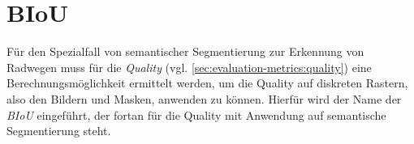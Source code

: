 
\section{\acf{BIoU}} \label{sec:eval:biou}

Für den Spezialfall von semantischer Segmentierung zur Erkennung von Radwegen muss für die \textit{Quality} (vgl. \autoref{sec:evaluation-metrics:quality}) 
eine Berechnungsmöglichkeit ermittelt werden, um die Quality auf diskreten Rastern, also den Bildern und Masken, anwenden zu können.
Hierfür wird der Name der \textit{\acf{BIoU}} eingeführt, der fortan für die Quality mit Anwendung auf semantische Segmentierung steht.

